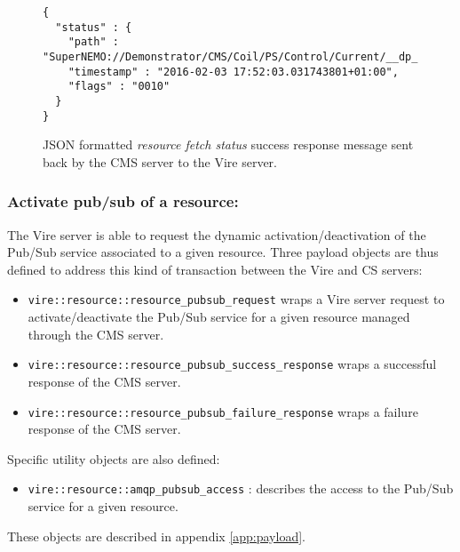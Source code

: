   \begin{figure}[h]
  \footnotesize
  \begin{Verbatim}[frame=single,xleftmargin=0.cm,label=\fbox{\texttt{JSON}}]
{
  "status" : {
    "path" : "SuperNEMO://Demonstrator/CMS/Coil/PS/Control/Current/__dp_read__",
    "timestamp" : "2016-02-03 17:52:03.031743801+01:00",
    "flags" : "0010"
  }
}
\end{Verbatim}
  \normalsize
  \caption{JSON formatted \emph{resource  fetch status}  success response message
    sent back by  the CMS server to  the Vire server.}\label{cms:json:resource_fetch_status_1}
  \end{figure}

\clearpage
\pagebreak

\subsubsection{Activate pub/sub of a resource:}

The Vire server is able to request the dynamic activation/deactivation
of the Pub/Sub  service associated to a given  resource. Three payload
objects are thus  defined to address this kind  of transaction between
the Vire and CS servers:

\begin{itemize}

\item \texttt{vire::resource::resource\_pubsub\_request}  wraps a Vire
  server  request to  activate/deactivate  the Pub/Sub  service for  a
  given resource managed through the CMS server.

\item     \texttt{vire::resource::resource\_pubsub\_success\_response}
  wraps a successful response of the CMS server.

\item     \texttt{vire::resource::resource\_pubsub\_failure\_response}
  wraps a failure response of the CMS server.

\end{itemize}

Specific utility objects are also defined:
\begin{itemize}

\item \texttt{vire::resource::amqp\_pubsub\_access} : describes the access to the Pub/Sub service
for a given resource.

\end{itemize}

These objects are described in appendix \ref{app:payload}.
